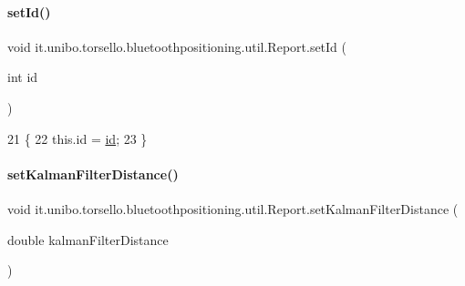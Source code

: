 \paragraph{\texorpdfstring{set\+Id()}{setId()}}
{\footnotesize\ttfamily void it.\+unibo.\+torsello.\+bluetoothpositioning.\+util.\+Report.\+set\+Id (\begin{DoxyParamCaption}\item[{int}]{id }\end{DoxyParamCaption})}


\begin{DoxyCode}
21                               \{
22         this.\textcolor{keywordtype}{id} = \hyperlink{classit_1_1unibo_1_1torsello_1_1bluetoothpositioning_1_1util_1_1Report_a3be425afdc95ab8ce0849c3e26756690_a3be425afdc95ab8ce0849c3e26756690}{id};
23     \}
\end{DoxyCode}
\hypertarget{classit_1_1unibo_1_1torsello_1_1bluetoothpositioning_1_1util_1_1Report_a6bfbc2b3cf03c4cf9e1527b3a7cac487_a6bfbc2b3cf03c4cf9e1527b3a7cac487}{}\label{classit_1_1unibo_1_1torsello_1_1bluetoothpositioning_1_1util_1_1Report_a6bfbc2b3cf03c4cf9e1527b3a7cac487_a6bfbc2b3cf03c4cf9e1527b3a7cac487} 
\paragraph{\texorpdfstring{set\+Kalman\+Filter\+Distance()}{setKalmanFilterDistance()}}
{\footnotesize\ttfamily void it.\+unibo.\+torsello.\+bluetoothpositioning.\+util.\+Report.\+set\+Kalman\+Filter\+Distance (\begin{DoxyParamCaption}\item[{double}]{kalman\+Filter\+Distance }\end{DoxyParamCaption})}


